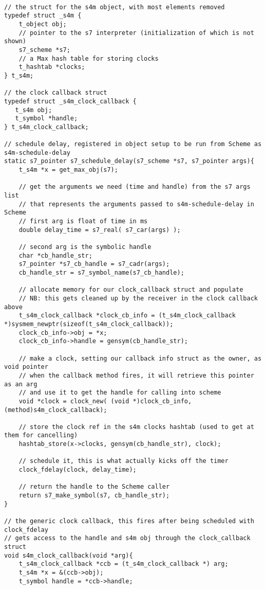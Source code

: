 \documentclass[acmsmall]{acmart}
\begin{document}
\begin{verbatim}

// the struct for the s4m object, with most elements removed
typedef struct _s4m {
    t_object obj;
    // pointer to the s7 interpreter (initialization of which is not shown)
    s7_scheme *s7;
    // a Max hash table for storing clocks
    t_hashtab *clocks;     
} t_s4m;

// the clock callback struct
typedef struct _s4m_clock_callback {
   t_s4m obj;
   t_symbol *handle; 
} t_s4m_clock_callback;

// schedule delay, registered in object setup to be run from Scheme as s4m-schedule-delay
static s7_pointer s7_schedule_delay(s7_scheme *s7, s7_pointer args){
    t_s4m *x = get_max_obj(s7);

    // get the arguments we need (time and handle) from the s7 args list
    // that represents the arguments passed to s4m-schedule-delay in Scheme
    // first arg is float of time in ms 
    double delay_time = s7_real( s7_car(args) );

    // second arg is the symbolic handle
    char *cb_handle_str;
    s7_pointer *s7_cb_handle = s7_cadr(args);
    cb_handle_str = s7_symbol_name(s7_cb_handle);

    // allocate memory for our clock_callback struct and populate
    // NB: this gets cleaned up by the receiver in the clock callback above
    t_s4m_clock_callback *clock_cb_info = (t_s4m_clock_callback *)sysmem_newptr(sizeof(t_s4m_clock_callback));
    clock_cb_info->obj = *x;
    clock_cb_info->handle = gensym(cb_handle_str);

    // make a clock, setting our callback info struct as the owner, as void pointer
    // when the callback method fires, it will retrieve this pointer as an arg 
    // and use it to get the handle for calling into scheme  
    void *clock = clock_new( (void *)clock_cb_info, (method)s4m_clock_callback);

    // store the clock ref in the s4m clocks hashtab (used to get at them for cancelling) 
    hashtab_store(x->clocks, gensym(cb_handle_str), clock); 

    // schedule it, this is what actually kicks off the timer
    clock_fdelay(clock, delay_time);

    // return the handle to the Scheme caller
    return s7_make_symbol(s7, cb_handle_str);
}

// the generic clock callback, this fires after being scheduled with clock_fdelay 
// gets access to the handle and s4m obj through the clock_callback struct 
void s4m_clock_callback(void *arg){
    t_s4m_clock_callback *ccb = (t_s4m_clock_callback *) arg;
    t_s4m *x = &(ccb->obj);
    t_symbol handle = *ccb->handle; 
  

\end{verbatim}
\end{document}
